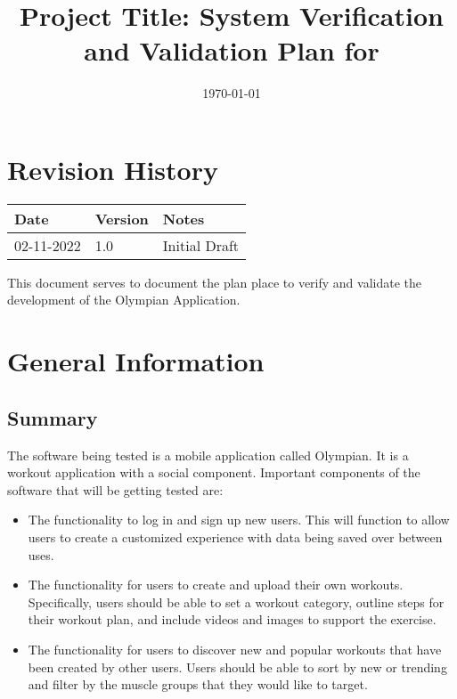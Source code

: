 \documentclass[12pt, titlepage]{article}
\begin{document}
	
	\title{Project Title: System Verification and Validation Plan for \progname{}} 
	\author{\authname}
	\date{\today}
	
	\maketitle
	
	
	\section{Revision History}
	
	\begin{tabularx}{\textwidth}{p{3cm}p{2cm}X}
		\toprule {\bf Date} & {\bf Version} & {\bf Notes}\\
		\midrule
		02-11-2022 & 1.0 & Initial Draft\\
		\bottomrule
	\end{tabularx}
	
	\newpage
	
	\tableofcontents
	
	\listoftables
	
	\newpage
	
	\newpage
	
	
	This document serves to document the plan place to verify and validate the development of the Olympian Application.
	
	\section{General Information}
	
	\subsection{Summary}
	
	
	The software being tested is a mobile application called Olympian. It is a workout application with a social component.
	Important components of the software that will be getting tested are:

	\begin{itemize}
		\item The functionality to log in and sign up new users. This will function to allow users to create a customized experience with data being saved over between uses.
		\item The functionality for users to create and upload their own workouts. Specifically, users should be able to set a workout category, outline steps for their workout plan, and include videos and images to support the exercise.
		\item The functionality for users to discover new and popular workouts that have been created by other users. Users should be able to sort by new or trending and filter by the muscle groups that they would like to target.
	\end{itemize}
	
\end{document}
